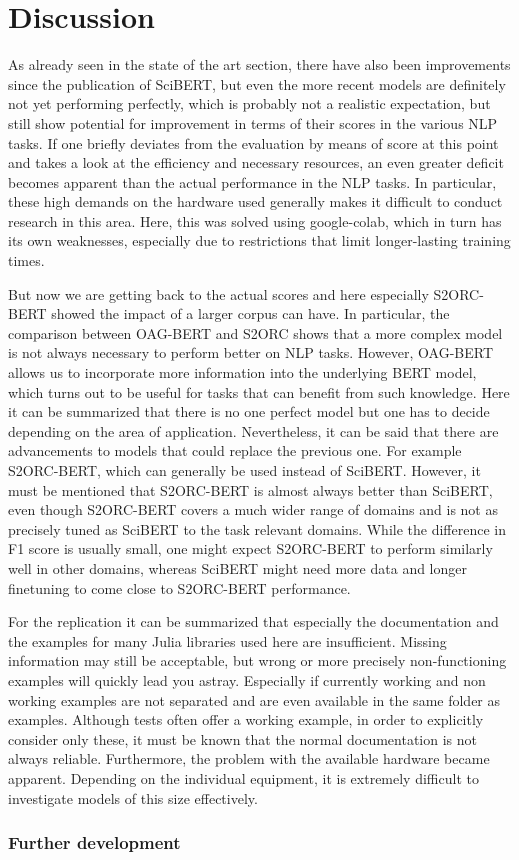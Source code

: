 \chapter{Discussion}
As already seen in the state of the art section, there have also been improvements since the publication of SciBERT, but even the more recent models are definitely not yet performing perfectly, which is probably not a realistic expectation, but still show potential for improvement in terms of their scores in the various NLP tasks. If one briefly deviates from the evaluation by means of score at this point and takes a look at the efficiency and necessary resources, an even greater deficit becomes apparent than the actual performance in the NLP tasks. In particular, these high demands on the hardware used generally makes it difficult to conduct research in this area. Here, this was solved using google-colab, which in turn has its own weaknesses, especially due to restrictions that limit longer-lasting training times. 

But now we are getting back to the actual scores and here especially S2ORC-BERT showed the impact of a larger corpus can have. In particular, the comparison between OAG-BERT and S2ORC shows that a more complex model is not always necessary to perform better on NLP tasks. However, OAG-BERT allows us to incorporate more information into the underlying BERT model, which turns out to be useful for tasks that can benefit from such knowledge. Here it can be summarized that there is no one perfect model but one has to decide depending on the area of application. Nevertheless, it can be said that there are advancements to models that could replace the previous one. For example S2ORC-BERT, which can generally be used instead of SciBERT. However, it must be mentioned that S2ORC-BERT is almost always better than SciBERT, even though S2ORC-BERT covers a much wider range of domains and is not as precisely tuned as SciBERT to the task relevant domains. While the difference in F1 score is usually small, one might expect S2ORC-BERT to perform similarly well in other domains, whereas SciBERT might need more data and longer finetuning to come close to S2ORC-BERT performance.  


For the replication it can be summarized that especially the documentation and the examples for many Julia libraries used here are insufficient. Missing information may still be acceptable, but wrong or more precisely non-functioning examples will quickly lead you astray. Especially if currently working and non working examples are not separated and are even available in the same folder as examples. Although tests often offer a working example, in order to explicitly consider only these, it must be known that the normal documentation is not always reliable. Furthermore, the problem with the available hardware became apparent. Depending on the individual equipment, it is extremely difficult to investigate models of this size effectively. 
\subsection{Further development}